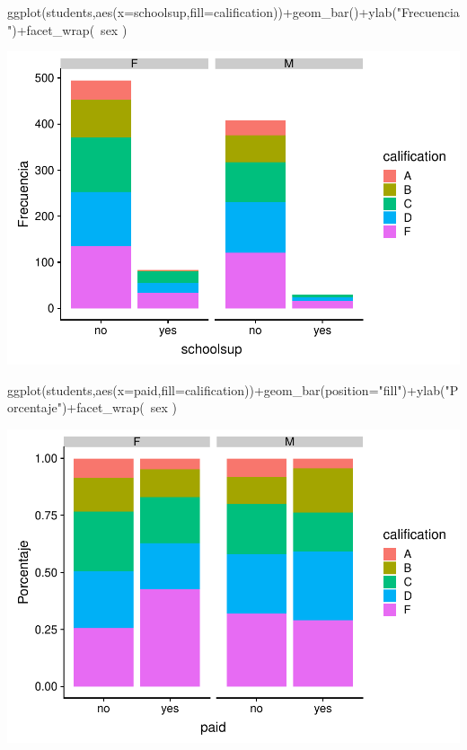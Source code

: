 \documentclass[]{article}
\newenvironment{Shaded}{\begin{snugshade}}{\end{snugshade}}
\newcommand{\DataTypeTok}[1]{\textcolor[rgb]{0.87,0.87,0.75}{#1}}
\newcommand{\KeywordTok}[1]{\textcolor[rgb]{0.94,0.87,0.69}{#1}}
\newcommand{\NormalTok}[1]{\textcolor[rgb]{0.80,0.80,0.80}{#1}}
\newcommand{\OperatorTok}[1]{\textcolor[rgb]{0.94,0.94,0.82}{#1}}
\newcommand{\StringTok}[1]{\textcolor[rgb]{0.80,0.58,0.58}{#1}}
\begin{document}
\begin{Shaded}
\begin{Highlighting}[]
\KeywordTok{ggplot}\NormalTok{(students,}\KeywordTok{aes}\NormalTok{(}\DataTypeTok{x=}\NormalTok{schoolsup,}\DataTypeTok{fill=}\NormalTok{calification))}\OperatorTok{+}\KeywordTok{geom_bar}\NormalTok{()}\OperatorTok{+}\KeywordTok{ylab}\NormalTok{(}\StringTok{"Frecuencia"}\NormalTok{)}\OperatorTok{+}\KeywordTok{facet_wrap}\NormalTok{(}\OperatorTok{~}\NormalTok{sex )}
\end{Highlighting}
\end{Shaded}

\includegraphics{Practica2_files/figure-latex/unnamed-chunk-25-2.pdf}

\begin{Shaded}
\begin{Highlighting}[]
\KeywordTok{ggplot}\NormalTok{(students,}\KeywordTok{aes}\NormalTok{(}\DataTypeTok{x=}\NormalTok{paid,}\DataTypeTok{fill=}\NormalTok{calification))}\OperatorTok{+}\KeywordTok{geom_bar}\NormalTok{(}\DataTypeTok{position=}\StringTok{"fill"}\NormalTok{)}\OperatorTok{+}\KeywordTok{ylab}\NormalTok{(}\StringTok{"Porcentaje"}\NormalTok{)}\OperatorTok{+}\KeywordTok{facet_wrap}\NormalTok{(}\OperatorTok{~}\NormalTok{sex )}
\end{Highlighting}
\end{Shaded}

\includegraphics{Practica2_files/figure-latex/unnamed-chunk-26-1.pdf}
\end{document}
